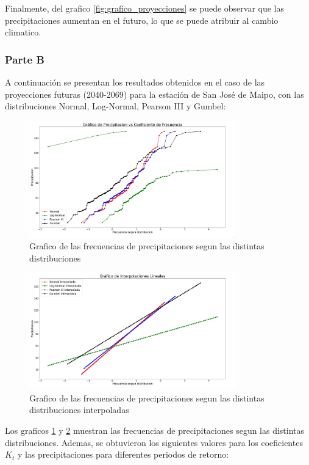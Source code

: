 \documentclass{article}  %
\begin{document}
Finalmente, del grafico \ref{fig:grafico_proyecciones} se puede observar que las precipitaciones aumentan en el futuro, lo que se puede atribuir al cambio climatico.

\newpage
\subsubsection*{Parte B}

A continuación se presentan los resultados obtenidos en el caso de las proyecciones futuras (2040-2069) para la estación de San José de Maipo, con las distribuciones Normal, Log-Normal, Pearson III y Gumbel:

\begin{figure}[H]
  \centering
  \includegraphics[width=0.8\textwidth]{grafico_b.jpg}
  \caption{Grafico de las frecuencias de precipitaciones segun las distintas distribuciones}
  \label{fig:grafico_b}
\end{figure}

\begin{figure}[H]
  \centering
  \includegraphics[width=0.8\textwidth]{grafico_b_interpolado.jpg}
  \caption{Grafico de las frecuencias de precipitaciones segun las distintas distribuciones interpoladas}
  \label{fig:grafico_b_interpolado}
\end{figure}

Los graficos \ref{fig:grafico_b} y \ref{fig:grafico_b_interpolado} muestran las frecuencias de precipitaciones segun las distintas distribuciones. Ademas, se obtuvieron los siguientes valores para los coeficientes \( K_t \) y las precipitaciones para diferentes periodos de retorno:
\end{document}
